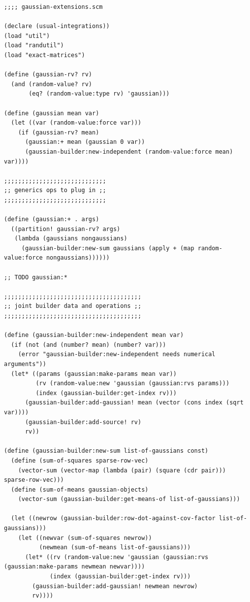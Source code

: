\documentclass{article}
\begin{document}
\begin{verbatim}
;;;; gaussian-extensions.scm

(declare (usual-integrations))
(load "util")
(load "randutil")
(load "exact-matrices")

(define (gaussian-rv? rv)
  (and (random-value? rv)
       (eq? (random-value:type rv) 'gaussian)))

(define (gaussian mean var)
  (let ((var (random-value:force var)))
    (if (gaussian-rv? mean)
      (gaussian:+ mean (gaussian 0 var))
      (gaussian-builder:new-independent (random-value:force mean) var))))

;;;;;;;;;;;;;;;;;;;;;;;;;;;;;
;; generics ops to plug in ;;
;;;;;;;;;;;;;;;;;;;;;;;;;;;;;

(define (gaussian:+ . args)
  ((partition! gaussian-rv? args)
   (lambda (gaussians nongaussians)
     (gaussian-builder:new-sum gaussians (apply + (map random-value:force nongaussians))))))

;; TODO gaussian:*

;;;;;;;;;;;;;;;;;;;;;;;;;;;;;;;;;;;;;;;
;; joint builder data and operations ;;
;;;;;;;;;;;;;;;;;;;;;;;;;;;;;;;;;;;;;;;

(define (gaussian-builder:new-independent mean var)
  (if (not (and (number? mean) (number? var)))
    (error "gaussian-builder:new-independent needs numerical arguments"))
  (let* ((params (gaussian:make-params mean var))
         (rv (random-value:new 'gaussian (gaussian:rvs params)))
         (index (gaussian-builder:get-index rv)))
      (gaussian-builder:add-gaussian! mean (vector (cons index (sqrt var))))
      (gaussian-builder:add-source! rv)
      rv))

(define (gaussian-builder:new-sum list-of-gaussians const)
  (define (sum-of-squares sparse-row-vec)
    (vector-sum (vector-map (lambda (pair) (square (cdr pair))) sparse-row-vec)))
  (define (sum-of-means gaussian-objects)
    (vector-sum (gaussian-builder:get-means-of list-of-gaussians)))

  (let ((newrow (gaussian-builder:row-dot-against-cov-factor list-of-gaussians)))
    (let ((newvar (sum-of-squares newrow))
          (newmean (sum-of-means list-of-gaussians)))
      (let* ((rv (random-value:new 'gaussian (gaussian:rvs (gaussian:make-params newmean newvar))))
             (index (gaussian-builder:get-index rv)))
        (gaussian-builder:add-gaussian! newmean newrow)
        rv))))


\end{verbatim}
\end{document}
